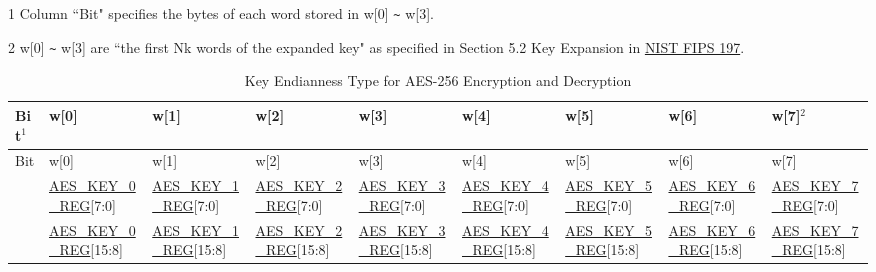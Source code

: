 \documentclass[main\_\_EN.tex]{subfiles}
\begin{document}
\begin{landscape}
\begin{table}[H]
\begin{threeparttable}
        \begin{tablenotes}
            \item[1] Column ``Bit" specifies the bytes of each word stored in w[0] \verb+~+ w[3].
            \item[2] w[0] \verb+~+ w[3] are ``the first Nk words of the expanded key" as specified in Section 5.2 Key Expansion in \href{https://nvlpubs.nist.gov/nistpubs/FIPS/NIST.FIPS.197.pdf}{NIST FIPS 197}.
        \end{tablenotes}
     \end{threeparttable}
\end{table}
    
    
\begin{ThreePartTable}

\begin{longtable}[c]
{ |l|l|l|l|l|l|l|l|l|}
\caption{Key Endianness Type for AES-256 Encryption and Decryption}\label{tab:aes-256-key-endian}\\
\hline 
\rowcolor{lightgray}
Bit$^1$ &   w[0]    &   w[1]    &   w[2]    &   w[3]    &   w[4]    &   w[5]&   w[6]    &   w[7]$^2$    \\\hline
\endfirsthead
\hline
\rowcolor{lightgray}
Bit &   w[0]    &   w[1]    &   w[2]    &   w[3]    &   w[4]    &   w[5]&   w[6]    &   w[7]    \\\hline
\endhead
\endfoot
[31:24]     &   \scriptsize \hyperref[regdesc:AESKEYnREG]{AES\_KEY\_0\_REG}[7:0]    &   \scriptsize \hyperref[regdesc:AESKEYnREG]{AES\_KEY\_1\_REG}[7:0]    &   \scriptsize \hyperref[regdesc:AESKEYnREG]{AES\_KEY\_2\_REG}[7:0]    &   \scriptsize \hyperref[regdesc:AESKEYnREG]{AES\_KEY\_3\_REG}[7:0]    &   \scriptsize \hyperref[regdesc:AESKEYnREG]{AES\_KEY\_4\_REG}[7:0]    &   \scriptsize \hyperref[regdesc:AESKEYnREG]{AES\_KEY\_5\_REG}[7:0]
& \scriptsize  \hyperref[regdesc:AESKEYnREG]{AES\_KEY\_6\_REG}[7:0]    &   \scriptsize \hyperref[regdesc:AESKEYnREG]{AES\_KEY\_7\_REG}[7:0]\\ \hline
[23:16]     &   \scriptsize \hyperref[regdesc:AESKEYnREG]{AES\_KEY\_0\_REG}[15:8]   &   \scriptsize \hyperref[regdesc:AESKEYnREG]{AES\_KEY\_1\_REG}[15:8]   &   \scriptsize \hyperref[regdesc:AESKEYnREG]{AES\_KEY\_2\_REG}[15:8]   &   \scriptsize \hyperref[regdesc:AESKEYnREG]{AES\_KEY\_3\_REG}[15:8]   &   \scriptsize \hyperref[regdesc:AESKEYnREG]{AES\_KEY\_4\_REG}[15:8]   &   \scriptsize \hyperref[regdesc:AESKEYnREG]{AES\_KEY\_5\_REG}[15:8]   &   \scriptsize \hyperref[regdesc:AESKEYnREG]{AES\_KEY\_6\_REG}[15:8]   &   \scriptsize \hyperref[regdesc:AESKEYnREG]{AES\_KEY\_7\_REG}[15:8]\\ \hline

\end{longtable}
\end{ThreePartTable}
\end{landscape}
\end{document}
